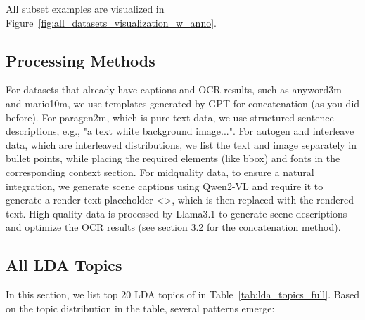All subset examples are visualized in Figure~\ref{fig:all_datasets_visualization_w_anno}.





\subsection{Processing Methods}
For datasets that already have captions and OCR results, such as anyword3m and mario10m, we use templates generated by GPT for concatenation (as you did before). For paragen2m, which is pure text data, we use structured sentence descriptions, e.g., "a text white background image...". For autogen and interleave data, which are interleaved distributions, we list the text and image separately in bullet points, while placing the required elements (like bbox) and fonts in the corresponding context section. For midquality data, to ensure a natural integration, we generate scene captions using Qwen2-VL and require it to generate a render text placeholder <>, which is then replaced with the rendered text. High-quality data is processed by Llama3.1 to generate scene descriptions and optimize the OCR results (see section 3.2 for the concatenation method).

\subsection{All LDA Topics}
\label{sec:all_lda}

In this section, we list top 20 LDA topics of \DatasetName in Table~\ref{tab:lda_topics_full}.
Based on the topic distribution in the table, several patterns emerge:

